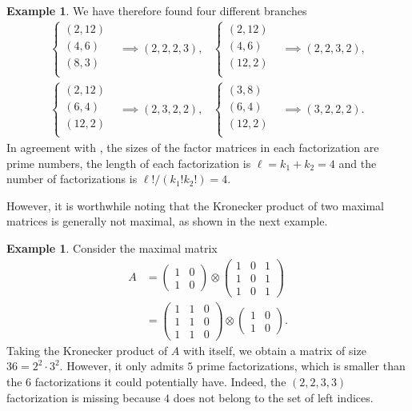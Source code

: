 \documentclass{article}
\numberwithin{equation}{section}
\theoremstyle{definition}
\newtheorem{example}[definition]{Example}
\begin{document}
\begin{example}
We have therefore found four different branches
\begin{align*}
\begin{cases}
    (2,12) \\
    (4,6) \\
    (8,3)\\
\end{cases}
&\implies (2,2,2,3), &
\begin{cases}
    (2,12) \\
    (4,6) \\
    (12,2)\\
\end{cases}
&\implies (2,2,3,2), \\
\begin{cases}
    (2,12) \\
    (6,4) \\
    (12,2)\\
\end{cases}
&\implies (2,3,2,2), &
\begin{cases}
    (3,8) \\
    (6,4) \\
    (12,2)\\
\end{cases}
&\implies (3,2,2,2).    
\end{align*}
In agreement with , the sizes of the factor matrices in each factorization are prime numbers, the length of each factorization is $\ell = k_1 + k_2 = 4$ and the number of factorizations is $\ell!/(k_1!k_2!)=4$.
\end{example}

However, it is worthwhile noting that the Kronecker product of two maximal matrices is generally not maximal, as shown in the next example.

\begin{example}
\label{ex: mat_36}
Consider the maximal matrix
\begin{align*}
A 
&=
\begin{pmatrix}
1 & 0 \\
1 & 0
\end{pmatrix}
\otimes
\begin{pmatrix}
1 & 0 & 1 \\
1 & 0 & 1 \\
1 & 0 & 1
\end{pmatrix} \\
&=
\begin{pmatrix}
1 & 1 & 0 \\
1 & 1 & 0 \\
1 & 1 & 0
\end{pmatrix}
\otimes
\begin{pmatrix}
1 & 0 \\
1 & 0
\end{pmatrix}.
\end{align*}
Taking the Kronecker product of $A$ with itself, we obtain a matrix of size $36=2^2 \cdot 3^2$. However, it only admits $5$ prime factorizations, which is smaller than the $6$ factorizations it could potentially have. Indeed, the $(2,2,3,3)$ factorization is missing because $4$ does not belong to the set of left indices.
\end{example}
\end{document}
